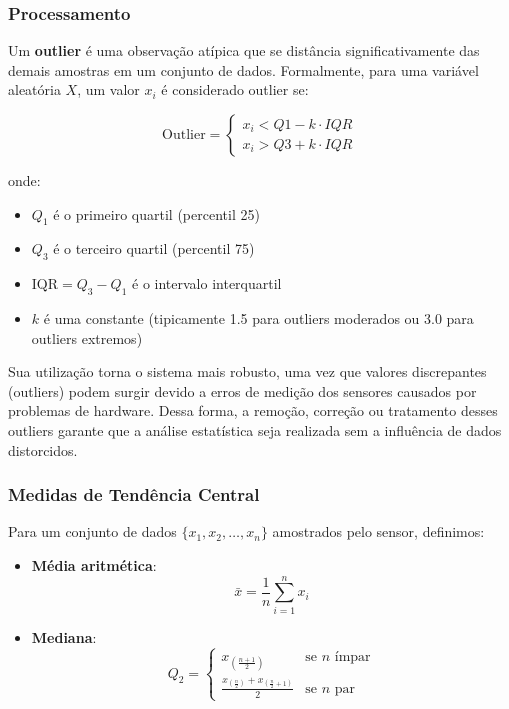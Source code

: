 \documentclass[12pt, a4paper]{article}
\begin{document}
\subsubsection{Processamento}
Um \textbf{outlier} é uma observação atípica que se distância significativamente das demais amostras em um conjunto de dados. Formalmente, para uma variável aleatória $X$, um valor $x_i$ é considerado outlier se:

\begin{itemize}
        \begin{equation}
            \text{Outlier} = \begin{cases}
                x_i < Q1 - k \cdot IQR \\
                x_i > Q3 + k \cdot IQR
            \end{cases}
        \end{equation}
\end{itemize}

onde:

\begin{itemize}
    \item $Q_1$ é o primeiro quartil (percentil 25)
    \item $Q_3$ é o terceiro quartil (percentil 75)
    \item $\text{IQR} = Q_3 - Q_1$ é o intervalo interquartil
    \item $k$ é uma constante (tipicamente 1.5 para outliers moderados ou 3.0 para outliers extremos)
\end{itemize}

Sua utilização torna o sistema mais robusto, uma vez que valores discrepantes (outliers) podem
surgir devido a erros de medição dos sensores causados por problemas de hardware. Dessa forma, a
remoção, correção ou tratamento desses outliers garante que a análise estatística seja realizada sem
a influência de dados distorcidos. 


\subsubsection{Medidas de Tendência Central}
Para um conjunto de dados $\{x_1, x_2, \dots, x_n\}$ amostrados pelo sensor, definimos:

\begin{itemize}
    \item \textbf{Média aritmética}:
        \begin{equation}
            \bar{x} = \frac{1}{n}\sum_{i=1}^n x_i
        \end{equation}

    \item \textbf{Mediana}:
        \begin{equation}
            Q_2 = \begin{cases}
                x_{\left(\frac{n+1}{2}\right)} & \text{se } n \text{ ímpar}\\
                \frac{x_{\left(\frac{n}{2}\right)} + x_{\left(\frac{n}{2}+1\right)}}{2} & \text{se } n \text{ par}
            \end{cases}
        \end{equation}
\end{itemize}
\end{document}
